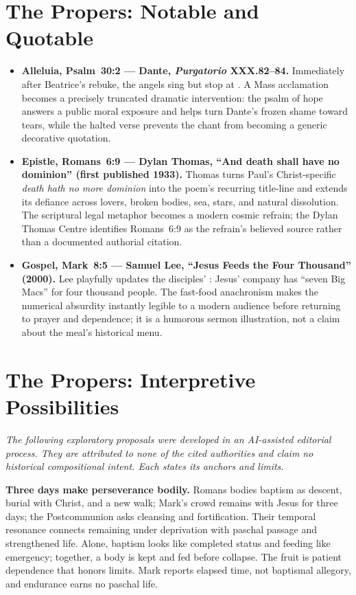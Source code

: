 \begin{deepstudy}
\sectionguard
\section*{The Propers: Notable and Quotable}

{\small
\begin{itemize}[itemsep=0.35em,topsep=0.2em,parsep=0pt]
\item \textbf{Alleluia, Psalm~30:2 --- Dante, \emph{Purgatorio} XXX.82--84.} Immediately after Beatrice's rebuke, the angels sing  but stop at . A Mass acclamation becomes a precisely truncated dramatic intervention: the psalm of hope answers a public moral exposure and helps turn Dante's frozen shame toward tears, while the halted verse prevents the chant from becoming a generic decorative quotation.

\item \textbf{Epistle, Romans~6:9 --- Dylan Thomas, ``And death shall have no dominion'' (first published 1933).} Thomas turns Paul's Christ-specific \emph{death hath no more dominion} into the poem's recurring title-line and extends its defiance across lovers, broken bodies, sea, stars, and natural dissolution. The scriptural legal metaphor becomes a modern cosmic refrain; the Dylan Thomas Centre identifies Romans~6:9 as the refrain's believed source rather than a documented authorial citation.

\item \textbf{Gospel, Mark~8:5 --- Samuel Lee, ``Jesus Feeds the Four Thousand'' (2000).} Lee playfully updates the disciples' : Jesus' company has ``seven Big Macs'' for four thousand people. The fast-food anachronism makes the numerical absurdity instantly legible to a modern audience before returning to prayer and dependence; it is a humorous sermon illustration, not a claim about the meal's historical menu.
\end{itemize}
}

\sectionguard
\section*{The Propers: Interpretive Possibilities}

\noindent\emph{The following exploratory proposals were developed in an AI-assisted editorial process. They are attributed to none of the cited authorities and claim no historical compositional intent. Each states its anchors and limits.}

\noindent\textbf{Three days make perseverance bodily.\enspace{}}
Romans bodies baptism as descent, burial with Christ, and a new walk; Mark's crowd remains with Jesus for three days; the Postcommunion asks cleansing and fortification. Their temporal resonance connects remaining under deprivation with paschal passage and strengthened life. Alone, baptism looks like completed status and feeding like emergency; together, a body is kept and fed before collapse. The fruit is patient dependence that honors limits. Mark reports elapsed time, not baptismal allegory, and endurance earns no paschal life.


\end{deepstudy}
